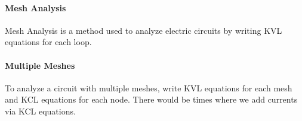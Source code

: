 \documentclass[11pt]{article}
\begin{document}
\paragraph{Mesh Analysis} Mesh Analysis is a method used to analyze electric circuits by writing KVL equations for each loop.
\paragraph{Multiple Meshes} To analyze a circuit with multiple meshes, write KVL equations for each mesh and KCL equations for each node. There would be times where we add currents via KCL equations.
\paragraph{}
\end{document}
